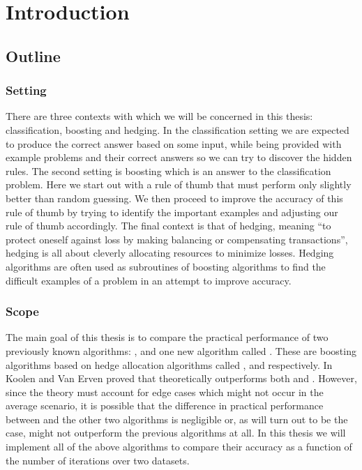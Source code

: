 
\chapter{Introduction}
\label{chap:intro}

\section{Outline}
\subsection{Setting}
There are three contexts with which we will be concerned in this thesis: classification, boosting and hedging.
In the classification setting we are expected to produce the correct answer based on some input, while being provided with example problems and their correct answers so we can try to discover the hidden rules. The second setting is boosting which is an answer to the classification problem. Here we start out with a rule of thumb that must perform only slightly better than random guessing. We then proceed to improve the accuracy of this rule of thumb by trying to identify the important examples and adjusting our rule of thumb accordingly. The final context is that of hedging, meaning ``to protect oneself against loss by making balancing or compensating transactions'', hedging is all about cleverly allocating resources to minimize losses. Hedging algorithms are often used as subroutines of boosting algorithms to find the difficult examples of a problem in an attempt to improve accuracy.

\subsection{Scope}

The main goal of this thesis is to compare the practical performance of two previously known algorithms: \adaB, \NHB and one new algorithm called \squintB. These are boosting algorithms based on hedge allocation algorithms called \hedge, \adaN and \squint respectively. In \cite{Koolen2015} Koolen and Van Erven proved that \squint theoretically outperforms both \hedge and \adaN. However, since the theory must account for edge cases which might not occur in the average scenario, it is possible that the difference in practical performance between \squint and the other two algorithms is negligible or, as will turn out to be the case, \squintB might not outperform the previous algorithms at all. In this thesis we will implement all of the above algorithms to compare their accuracy as a function of the number of iterations over two datasets.

